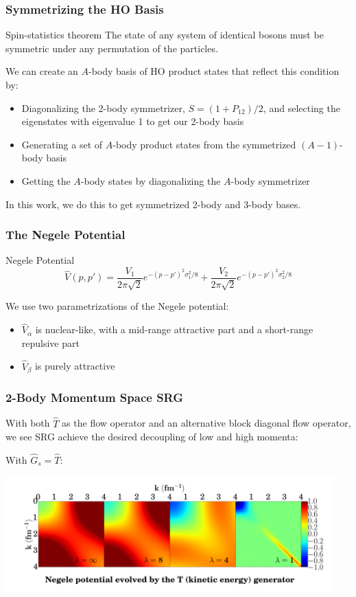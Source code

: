 \documentclass{beamer}
\begin{document}
{\begin{frame}
\frametitle{Symmetrizing the HO Basis}
\begin{alertblock}{Spin-statistics theorem}
The state of any system of identical bosons must be symmetric under any permutation of the particles.
\end{alertblock}

\pause

We can create an $A$-body basis of HO product states that reflect this condition by:
\begin{itemize}
    \item Diagonalizing the 2-body symmetrizer, $S = (1 + P_{12})/2$, and selecting the eigenstates with eigenvalue 1 to get our 2-body basis
    \item Generating a set of $A$-body product states from the symmetrized $(A-1)$-body basis
    \item Getting the $A$-body states by diagonalizing the $A$-body symmetrizer
\end{itemize}\pause
In this work, we do this to get symmetrized 2-body and 3-body bases.
\end{frame}

\begin{frame}
\frametitle{The Negele Potential}
\begin{alertblock}{Negele Potential}
\begin{equation}
\hat{V}(p, p') = \frac{V_1}{2\pi\sqrt2}e^{-(p-p')^2\sigma_1^2/8} + \frac{V_2}{2\pi\sqrt2}e^{-(p-p')^2\sigma_2^2/8}
\end{equation}
\end{alertblock}
We use two parametrizations of the Negele potential:
\begin{itemize}
    \item $\hat{V}_\alpha$ is nuclear-like, with a mid-range attractive part and a short-range repulsive part
    \item $\hat{V}_\beta$ is purely attractive
\end{itemize}
\end{frame}

\begin{frame}
\frametitle{2-Body Momentum Space SRG}
With both $\hat{T}$ as the flow operator and an alternative block diagonal flow operator, we see SRG achieve the desired decoupling of low and high momenta:


\vspace{\baselineskip}
With $\hat{G}_s = \hat{T}$:
\begin{center}
\includegraphics[trim={0 5cm 0 0},clip,width=0.95\textwidth]{T_evolution}
\end{center}


\end{frame}}
\end{document}
